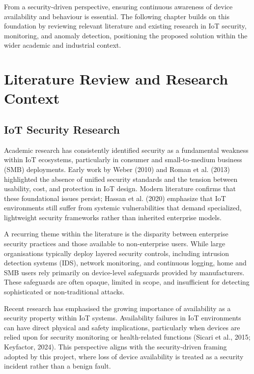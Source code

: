 From a security-driven perspective, ensuring continuous awareness of device availability and behaviour is essential. The following chapter builds on this foundation by reviewing relevant literature and existing research in IoT security, monitoring, and anomaly detection, positioning the proposed solution within the wider academic and industrial context.

\chapter{Literature Review and Research Context}

\section{IoT Security Research}

Academic research has consistently identified security as a fundamental weakness within IoT ecosystems, particularly in consumer and small-to-medium business (SMB) deployments. Early work by Weber (2010) and Roman et al. (2013) highlighted the absence of unified security standards and the tension between usability, cost, and protection in IoT design. Modern literature confirms that these foundational issues persist; Hassan et al. (2020) emphasize that IoT environments still suffer from systemic vulnerabilities that demand specialized, lightweight security frameworks rather than inherited enterprise models.

A recurring theme within the literature is the disparity between enterprise security practices and those available to non-enterprise users. While large organisations typically deploy layered security controls, including intrusion detection systems (IDS), network monitoring, and continuous logging, home and SMB users rely primarily on device-level safeguards provided by manufacturers. These safeguards are often opaque, limited in scope, and insufficient for detecting sophisticated or non-traditional attacks.

Recent research has emphasised the growing importance of availability as a security property within IoT systems. Availability failures in IoT environments can have direct physical and safety implications, particularly when devices are relied upon for security monitoring or health-related functions (Sicari et al., 2015; Keyfactor, 2024). This perspective aligns with the security-driven framing adopted by this project, where loss of device availability is treated as a security incident rather than a benign fault.


